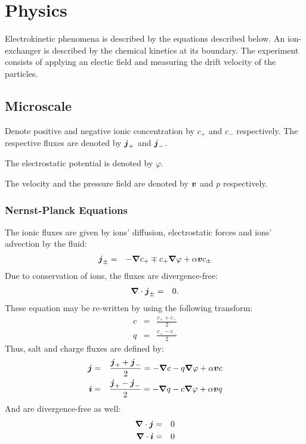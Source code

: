 \section{Physics}
Electrokinetic phenomena is described by the equations described below.
An ion-exchanger is described by the chemical kinetics at its boundary.
The experiment consists of applying an electic field and measuring the drift velocity of the particles.

\subsection{Microscale}
Denote positive and negative ionic concentration by $c_+$ and $c_-$ respectively.
The respective fluxes are denoted by $\boldsymbol{j}_+$ and $\boldsymbol{j}_-$.

The electrostatic potential is denoted by $\varphi$. 

The velocity and the pressure field are denoted by $\boldsymbol{v}$ and $p$ respectively.

\subsubsection{Nernst-Planck Equations}
The ionic fluxes are given by ions' diffusion, electrostatic forces and ions' advection by the fluid:
\begin{eqnarray}
 \nonumber \boldsymbol{j}_\pm &=& -\boldsymbol{\nabla} c_+ \mp c_+ \boldsymbol{\nabla} \varphi + \alpha \boldsymbol{v} c_\pm
\end{eqnarray}
Due to conservation of ions, the fluxes are divergence-free:
\begin{eqnarray}
\boldsymbol{\nabla} \cdot \boldsymbol{j}_\pm &=& 0.
\end{eqnarray}
These equation may be re-written by using the following transform:
\begin{eqnarray}
 \nonumber c &=& \frac{c_+ + c_-}{2}\\
 \nonumber q &=& \frac{c_+ - c_-}{2}
\end{eqnarray}
Thus, salt and charge fluxes are defined by:
\begin{eqnarray}
 \nonumber \boldsymbol{j} &=& \frac{\boldsymbol{j}_+ + \boldsymbol{j}_-}{2} = -\boldsymbol{\nabla} c - q \boldsymbol{\nabla} \varphi + \alpha \boldsymbol{v} c \\
 \nonumber \boldsymbol{i} &=& \frac{\boldsymbol{j}_+ - \boldsymbol{j}_-}{2} = -\boldsymbol{\nabla} q - c \boldsymbol{\nabla} \varphi + \alpha \boldsymbol{v} q
\end{eqnarray}
And are divergence-free as well:
\begin{eqnarray}
\boldsymbol{\nabla} \cdot \boldsymbol{j} &=& 0 \\
\boldsymbol{\nabla} \cdot \boldsymbol{i} &=& 0 
\end{eqnarray}

